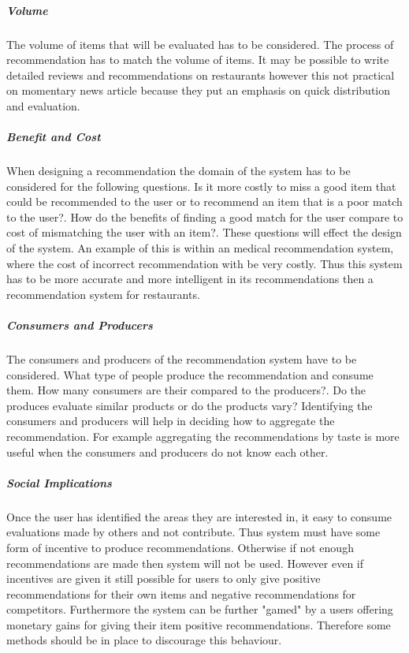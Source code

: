 \documentclass[a4paper,oneside,11pt]{report}
\begin{document}
\subparagraph{Volume}
The volume of items that will be evaluated has to be considered. The process of recommendation has to match the volume of items. It may be possible to write detailed reviews and recommendations on restaurants however this not practical on momentary news article because they put an emphasis on quick distribution and evaluation.

\subparagraph{Benefit and Cost}
When designing a recommendation the domain of the system has to be considered for the following questions. Is it more costly to miss a good item that could be recommended to the user or to recommend an item that is a poor match to the user?. How do the benefits of finding a good match for the user compare to cost of mismatching the user with an item?. These questions will effect the design of the system. An example of this is within an medical recommendation system, where the cost of incorrect recommendation with be very costly. Thus this system has to be more accurate and more intelligent in its recommendations then a recommendation system for restaurants.

\subparagraph{Consumers and Producers}
The consumers and producers of the recommendation system have to be considered. What type of people produce the recommendation and consume them. How many consumers are their compared to the producers?. Do the produces evaluate similar products or do the products vary? Identifying the consumers and producers will help in deciding how to aggregate the recommendation. For example aggregating the recommendations by taste is more useful when the consumers and producers do not know each other. 

\subparagraph{Social Implications}
Once the user has identified the areas they are interested in, it easy to consume evaluations made by others and not contribute. Thus system must have some form of incentive to produce recommendations. Otherwise if not enough recommendations are made then system will not be used. However even if incentives are given it still possible for users to only give positive recommendations for their own items and negative recommendations for competitors.  Furthermore the system can be further "gamed" by a users offering monetary gains for giving their item positive recommendations. Therefore some methods should be in place to discourage this behaviour.
\end{document}
